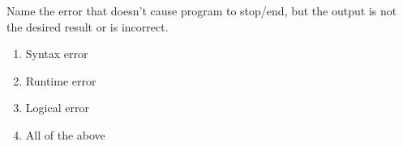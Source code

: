 \question
Name the error that doesn't cause program to stop/end, but the output is not the desired result or is incorrect.

\begin{enumerate}
\item Syntax error
\item Runtime error
\item Logical error
\item All of the above
\end{enumerate}

